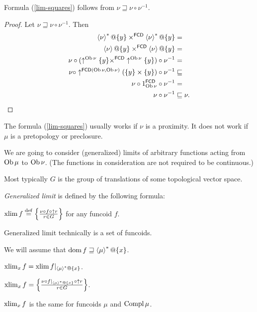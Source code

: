 \begin{prop}
Formula (\ref{lim-squares}) follows from $\nu\sqsupseteq\nu\circ\nu^{-1}$.\end{prop}
\begin{proof}
Let $\nu\sqsupseteq\nu\circ\nu^{-1}$. Then
\begin{align*}
\rsupfun{\nu}@\{y\}\times^{\mathsf{FCD}}\rsupfun{\nu}@\{y\} & =\\
\supfun{\nu}@\{y\}\times^{\mathsf{FCD}}\supfun{\nu}@\{y\} & =\\
\nu\circ(\uparrow^{\Ob\nu}\{y\}\times^{\mathsf{FCD}}\uparrow^{\Ob\nu}\{y\})\circ\nu^{-1} & =\\
\nu\circ\uparrow^{\mathsf{FCD}(\Ob\nu,\Ob\nu)}(\{y\}\times\{y\})\circ\nu^{-1} & \sqsubseteq\\
\nu\circ1_{\Ob\nu}^{\mathsf{FCD}}\circ\nu^{-1} & =\\
\nu\circ\nu^{-1} & \sqsubseteq\nu.
\end{align*}
\end{proof}
\begin{rem}
The formula (\ref{lim-squares}) usually works if $\nu$ is a proximity.
It does not work if $\mu$ is a pretopology or preclosure.
\end{rem}
We are going to consider (generalized) limits of arbitrary functions
acting from $\operatorname{Ob}\mu$ to $\operatorname{Ob}\nu$. (The functions in consideration
are not required to be continuous.)
\begin{rem}
Most typically $G$ is the group of translations of some topological
vector space.
\end{rem}
\emph{Generalized limit} is defined by the following formula:
\begin{defn}
$\operatorname{xlim} f\overset{\mathrm{def}}{=}\left\{ \frac{\nu\circ f\circ\uparrow r}{r\in G}\right\}$
for any funcoid $f$.\end{defn}
\begin{rem}
Generalized limit technically is a set of funcoids.
\end{rem}
We will assume that $\operatorname{dom} f\sqsupseteq\left\langle \mu\right\rangle ^{\ast}@\{x\}$.
\begin{defn}
$\operatorname{xlim}_{x}f=\operatorname{xlim} f|_{\left\langle \mu\right\rangle ^{\ast}@\{x\}}$.\end{defn}
\begin{obvious}
$\operatorname{xlim}_{x}f=\left\{ \frac{\nu\circ f|_{\left\langle \mu\right\rangle ^{\ast}@\{x\}}\circ\uparrow r}{r\in G}\right\}$.\end{obvious}
\begin{rem}
$\operatorname{xlim}_{x}f$ is the same for funcoids $\mu$ and $\operatorname{Compl}\mu$.
\end{rem}

